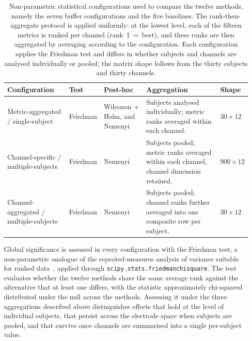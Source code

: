 \documentclass[MScCS,12pt,oneside,final]{uccthesis}
\begin{document}
\begin{table}[!htb]
    \centering
    \begin{tabularx}{\textwidth}{@{} 
        >{\raggedright\arraybackslash}p{3.5cm} 
        l 
        >{\raggedright\arraybackslash}p{2.0cm} 
        >{\raggedright\arraybackslash}X 
        l 
        @{}}
        \toprule
        \textbf{Configuration} & \textbf{Test} & \textbf{Post-hoc} & \textbf{Aggregation} & \textbf{Shape} \\
        \midrule
        Metric-aggregated / single-subject & Friedman & Wilcoxon + Holm, and Nemenyi & Subjects analysed individually; metric ranks averaged within each channel. & $30 \times 12$ \\
        \addlinespace
        Channel-specific / multiple-subjects & Friedman & Nemenyi & Subjects pooled; metric ranks averaged within each channel, channel dimension retained. & $900 \times 12$ \\
        \addlinespace
        Channel-aggregated / multiple-subjects & Friedman & Nemenyi & Subjects pooled; channel ranks further averaged into one composite row per subject. & $30 \times 12$ \\
        \bottomrule
    \end{tabularx}
    \caption{Non-parametric statistical configurations used to compare the twelve methods, namely
the seven buffer configurations and the five baselines. The rank-then-aggregate protocol is 
applied uniformly: at the lowest level, each of the fifteen metrics is ranked per channel 
(rank~1~=~best), and these ranks are then aggregated by averaging according to the configuration. 
Each configuration applies the Friedman test and differs in whether subjects and channels are 
analysed individually or pooled; the matrix shape follows from the thirty subjects and thirty 
channels.}
    \label{tab:statistical_tests}
\end{table}

Global significance is assessed in every configuration with the Friedman test, a non-parametric analogue of the repeated-measures analysis of variance suitable for ranked data~\parencite{friedman1937use}, applied through \texttt{scipy.stats.friedmanchisquare}. The test evaluates whether the twelve methods share the same average rank against the alternative that at least one differs, with the statistic approximately chi-squared distributed under the null across the methods. Assessing it under the three aggregations described above distinguishes effects that hold at the level of individual subjects, that persist across the electrode space when subjects are pooled, and that survive once channels are summarised into a
single per-subject value.
\end{document}
